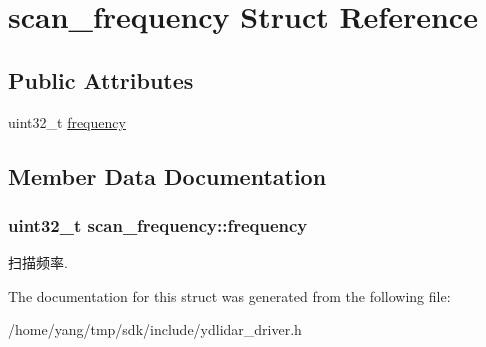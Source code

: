 \hypertarget{structscan__frequency}{}\section{scan\+\_\+frequency Struct Reference}
\label{structscan__frequency}
\subsection*{Public Attributes}
\begin{DoxyCompactItemize}
\item 
uint32\+\_\+t \hyperlink{structscan__frequency_ae4f2152e77416cff02f44452355f2808}{frequency}
\end{DoxyCompactItemize}


\subsection{Member Data Documentation}
\subsubsection[{\texorpdfstring{frequency}{frequency}}]{\setlength{\rightskip}{0pt plus 5cm}uint32\+\_\+t scan\+\_\+frequency\+::frequency}\hypertarget{structscan__frequency_ae4f2152e77416cff02f44452355f2808}{}\label{structscan__frequency_ae4f2152e77416cff02f44452355f2808}
扫描频率. 

The documentation for this struct was generated from the following file\+:\begin{DoxyCompactItemize}
\item 
/home/yang/tmp/sdk/include/ydlidar\+\_\+driver.\+h\end{DoxyCompactItemize}
